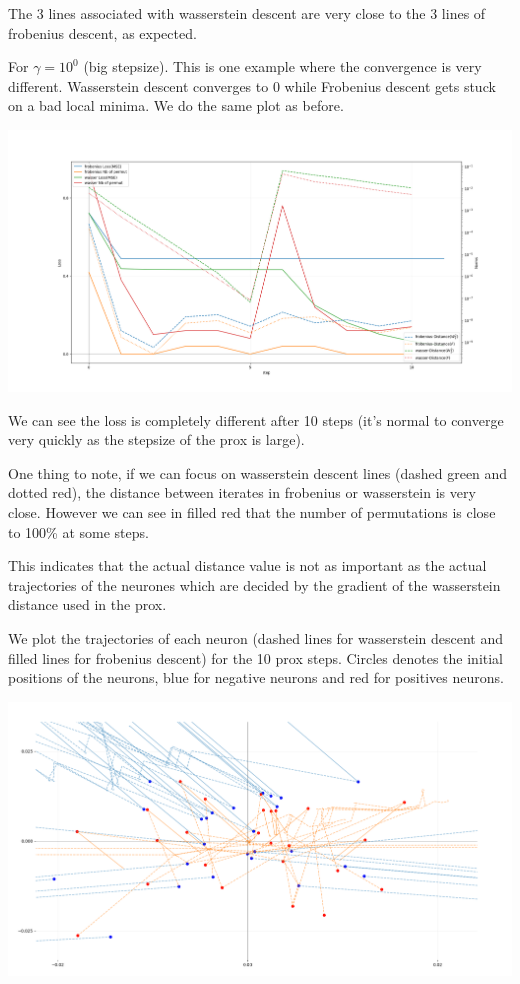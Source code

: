 The 3 lines associated with wasserstein descent are very close to the 3 lines of frobenius descent, as expected.

For $\gamma = 10^0$ (big stepsize). This is one example where the convergence is very different. Wasserstein descent converges to 0 while Frobenius descent gets stuck on a bad local minima. We do the same plot as before.

\includegraphics[width=1.0\textwidth]{imgs/grand_pas_10steps.png}

We can see the loss is completely different after 10 steps (it's normal to converge very quickly as the stepsize of the prox is large).

One thing to note, if we can focus on wasserstein descent lines (dashed green and dotted red), the distance between iterates in frobenius or wasserstein is very close. However we can see in filled red that the number of permutations is close to 100\% at some steps.

This indicates that the actual distance value is not as important as the actual trajectories of the neurones which are decided by the gradient of the wasserstein distance used in the prox.

We plot the trajectories of each neuron (dashed lines for wasserstein descent and filled lines for frobenius descent) for the 10 prox steps. Circles denotes the initial positions of the neurons, blue for negative neurons and red for positives neurons.

\includegraphics[width=1.0\textwidth]{imgs/grand_pas_10steps_trajs.png}

